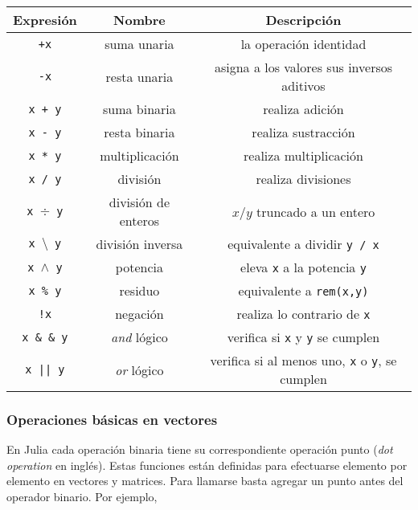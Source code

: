 \begin{center}
	\begin{tabular}{|c|c|c|} 
		\hline
		Expresión & Nombre & Descripción \\ 
		\hline 
		\texttt{+x} & suma unaria & la operación identidad \\ 

		\texttt{-x} & resta unaria & asigna a los valores sus inversos aditivos \\ 

		\texttt{x + y} & suma binaria & realiza adición \\ 

		\texttt{x - y} & resta binaria & realiza sustracción \\

		\texttt{x * y} & multiplicación & realiza multiplicación \\

		\texttt{x / y} & división & realiza divisiones \\

		\texttt{x $\div$ y} & división de enteros & $x / y$ truncado a un entero \\

		\texttt{x $\setminus$ y} & división inversa & equivalente a dividir \texttt{y / x} \\

		\texttt{x $\wedge$ y} & potencia & eleva \texttt{x} a la potencia \texttt{y} \\

		\texttt{x \% y} & residuo & equivalente a \texttt{rem(x,y)} \\
		
		\texttt{!x} & negación & realiza lo contrario de \texttt{x} \\
		
		\texttt{x \& \& y} & \textit{and} lógico & verifica si \texttt{x} y \texttt{y} se cumplen \\
		
		\texttt{x || y} & \textit{or} lógico & verifica si al menos uno, \texttt{x} o \texttt{y},  se cumplen \\
		\hline
	\end{tabular} 
	 \label{operaciones_basicas_julia}
\end{center}


\subsubsection{Operaciones básicas en vectores}
En \textsf{Julia} cada operación binaria tiene su correspondiente operación punto (\textit{dot operation} en inglés). Estas funciones están definidas para efectuarse elemento por elemento en vectores y matrices. Para llamarse basta agregar un punto antes del operador binario. Por ejemplo,

